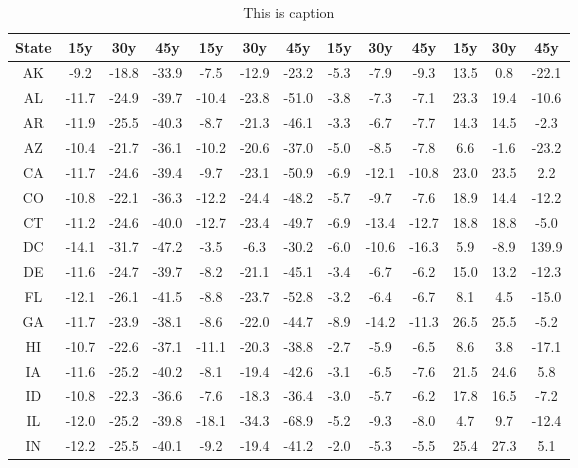 \begin{table}
\centering
\caption{This is caption}
\label{tab:hybrid_table}
\begin{tabular}{ccccccccccccc}
\toprule
State &   15y &   30y &   45y &   15y &   30y &    45y &  15y &   30y &   45y &  15y &   30y &   45y \\
\midrule
   AK &  -9.2 & -18.8 & -33.9 &  -7.5 & -12.9 &  -23.2 & -5.3 &  -7.9 &  -9.3 & 13.5 &   0.8 & -22.1 \\
   AL & -11.7 & -24.9 & -39.7 & -10.4 & -23.8 &  -51.0 & -3.8 &  -7.3 &  -7.1 & 23.3 &  19.4 & -10.6 \\
   AR & -11.9 & -25.5 & -40.3 &  -8.7 & -21.3 &  -46.1 & -3.3 &  -6.7 &  -7.7 & 14.3 &  14.5 &  -2.3 \\
   AZ & -10.4 & -21.7 & -36.1 & -10.2 & -20.6 &  -37.0 & -5.0 &  -8.5 &  -7.8 &  6.6 &  -1.6 & -23.2 \\
   CA & -11.7 & -24.6 & -39.4 &  -9.7 & -23.1 &  -50.9 & -6.9 & -12.1 & -10.8 & 23.0 &  23.5 &   2.2 \\
   CO & -10.8 & -22.1 & -36.3 & -12.2 & -24.4 &  -48.2 & -5.7 &  -9.7 &  -7.6 & 18.9 &  14.4 & -12.2 \\
   CT & -11.2 & -24.6 & -40.0 & -12.7 & -23.4 &  -49.7 & -6.9 & -13.4 & -12.7 & 18.8 &  18.8 &  -5.0 \\
   DC & -14.1 & -31.7 & -47.2 &  -3.5 &  -6.3 &  -30.2 & -6.0 & -10.6 & -16.3 &  5.9 &  -8.9 & 139.9 \\
   DE & -11.6 & -24.7 & -39.7 &  -8.2 & -21.1 &  -45.1 & -3.4 &  -6.7 &  -6.2 & 15.0 &  13.2 & -12.3 \\
   FL & -12.1 & -26.1 & -41.5 &  -8.8 & -23.7 &  -52.8 & -3.2 &  -6.4 &  -6.7 &  8.1 &   4.5 & -15.0 \\
   GA & -11.7 & -23.9 & -38.1 &  -8.6 & -22.0 &  -44.7 & -8.9 & -14.2 & -11.3 & 26.5 &  25.5 &  -5.2 \\
   HI & -10.7 & -22.6 & -37.1 & -11.1 & -20.3 &  -38.8 & -2.7 &  -5.9 &  -6.5 &  8.6 &   3.8 & -17.1 \\
   IA & -11.6 & -25.2 & -40.2 &  -8.1 & -19.4 &  -42.6 & -3.1 &  -6.5 &  -7.6 & 21.5 &  24.6 &   5.8 \\
   ID & -10.8 & -22.3 & -36.6 &  -7.6 & -18.3 &  -36.4 & -3.0 &  -5.7 &  -6.2 & 17.8 &  16.5 &  -7.2 \\
   IL & -12.0 & -25.2 & -39.8 & -18.1 & -34.3 &  -68.9 & -5.2 &  -9.3 &  -8.0 &  4.7 &   9.7 & -12.4 \\
   IN & -12.2 & -25.5 & -40.1 &  -9.2 & -19.4 &  -41.2 & -2.0 &  -5.3 &  -5.5 & 25.4 &  27.3 &   5.1 \\

\end{tabular}
\end{table}
